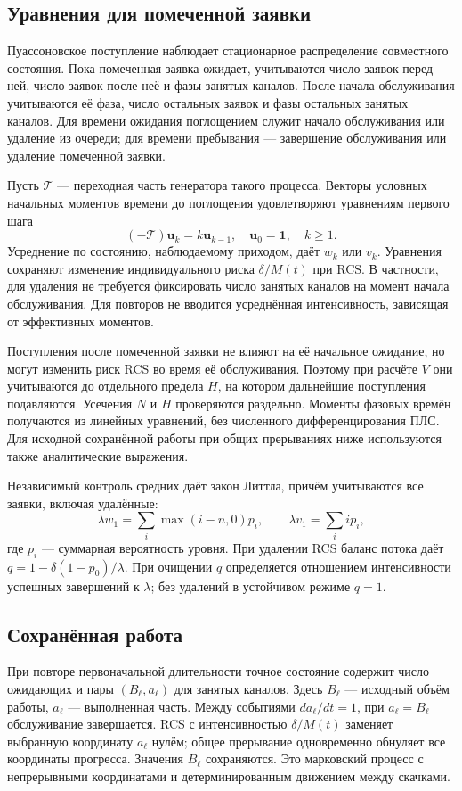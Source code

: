 \subsection{Уравнения для помеченной заявки}
Пуассоновское поступление наблюдает стационарное распределение совместного состояния. Пока помеченная заявка ожидает, учитываются число заявок перед ней, число заявок после неё и фазы занятых каналов. После начала обслуживания учитываются её фаза, число остальных заявок и фазы остальных занятых каналов. Для времени ожидания поглощением служит начало обслуживания или удаление из очереди; для времени пребывания --- завершение обслуживания или удаление помеченной заявки.

Пусть \(\mathcal T\) --- переходная часть генератора такого процесса. Векторы условных начальных моментов времени до поглощения удовлетворяют уравнениям первого шага
\[
(-\mathcal T)\boldsymbol u_k=k\boldsymbol u_{k-1},\quad
\boldsymbol u_0=\mathbf1,\quad k\ge1.
\]
Усреднение по состоянию, наблюдаемому приходом, даёт \(w_k\) или \(v_k\). Уравнения сохраняют изменение индивидуального риска \(\delta/M(t)\) при RCS. В частности, для удаления не требуется фиксировать число занятых каналов на момент начала обслуживания. Для повторов не вводится усреднённая интенсивность, зависящая от эффективных моментов.

Поступления после помеченной заявки не влияют на её начальное ожидание, но могут изменить риск RCS во время её обслуживания. Поэтому при расчёте \(V\) они учитываются до отдельного предела \(H\), на котором дальнейшие поступления подавляются. Усечения \(N\) и \(H\) проверяются раздельно. Моменты фазовых времён получаются из линейных уравнений, без численного дифференцирования ПЛС. Для исходной сохранённой работы при общих прерываниях ниже используются также аналитические выражения.

Независимый контроль средних даёт закон Литтла, причём учитываются все заявки, включая удалённые:
\[
\lambda w_1=\sum_i\max(i-n,0)p_i,\qquad
\lambda v_1=\sum_i i p_i,
\]
где \(p_i\) --- суммарная вероятность уровня. При удалении RCS баланс потока даёт \(q=1-\delta(1-p_0)/\lambda\). При очищении \(q\) определяется отношением интенсивности успешных завершений к \(\lambda\); без удалений в устойчивом режиме \(q=1\).

\subsection{Сохранённая работа}
При повторе первоначальной длительности точное состояние содержит число ожидающих и пары \((B_\ell,a_\ell)\) для занятых каналов. Здесь \(B_\ell\) --- исходный объём работы, \(a_\ell\) --- выполненная часть. Между событиями \(da_\ell/dt=1\), при \(a_\ell=B_\ell\) обслуживание завершается. RCS с интенсивностью \(\delta/M(t)\) заменяет выбранную координату \(a_\ell\) нулём; общее прерывание одновременно обнуляет все координаты прогресса. Значения \(B_\ell\) сохраняются. Это марковский процесс с непрерывными координатами и детерминированным движением между скачками.

